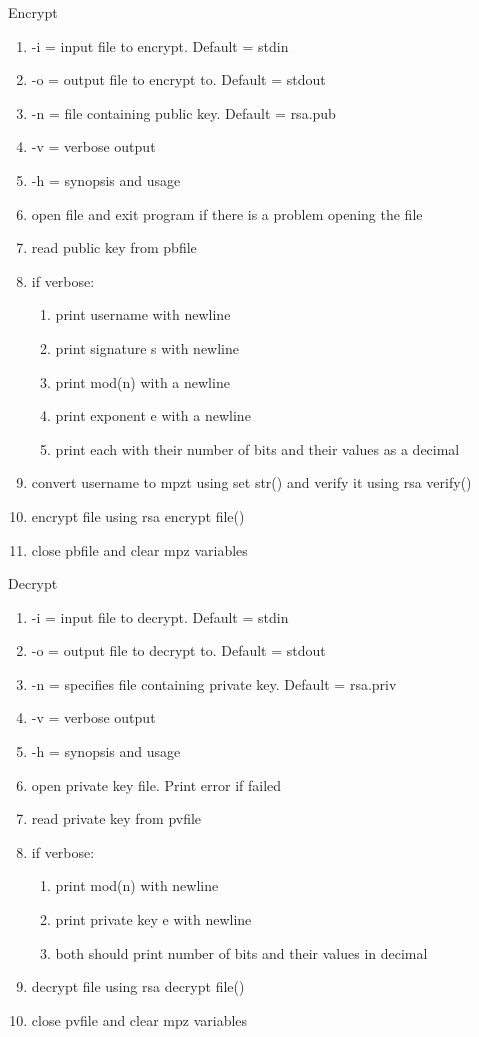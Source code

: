 \documentclass[11pt]{article}
\begin{document}
\begin{enumerate}
\begin{enumerate}
\begin{enumerate}
\end{enumerate}
Encrypt
\begin{enumerate}
\item -i = input file to encrypt. Default = stdin
\item -o = output file to encrypt to. Default = stdout
\item -n = file containing public key. Default = rsa.pub
\item -v = verbose output
\item -h = synopsis and usage
\item open file and exit program if there is a problem opening the file
\item read public key from pbfile
\item if verbose:
	\begin{enumerate}
	\item print username with newline
	\item print signature s with newline
	\item print mod(n) with a newline
	\item print exponent e with a newline
	\item print each with their number of bits and their values as a decimal
	\end{enumerate}
\item convert username to mpzt using set str() and verify it using rsa verify() 
\item encrypt file using rsa encrypt file()
\item close pbfile and clear mpz variables
\end{enumerate}
Decrypt
\begin{enumerate}
\item -i = input file to decrypt. Default = stdin
\item -o = output file to decrypt to. Default = stdout
\item -n = specifies file containing private key. Default = rsa.priv
\item -v = verbose output
\item -h = synopsis  and usage
\item open private key file. Print error if failed
\item read private key from pvfile
\item if verbose:
	\begin{enumerate}
	\item print mod(n) with newline
	\item print private key e with newline
	\item both should print number of bits and their values in decimal
	\end{enumerate}
\item decrypt file using rsa decrypt file()
\item close pvfile and clear mpz variables
\end{enumerate}
\end{document}
